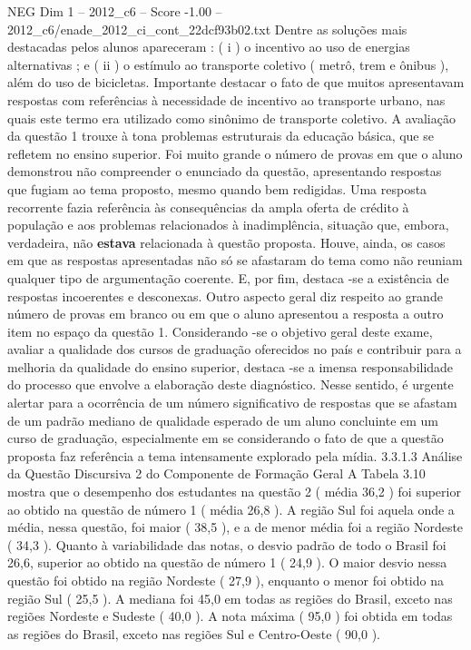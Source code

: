 \begin{textsample}{NEG Dim 1 – 2012\_c6 – Score -1.00 – 2012\_c6/enade\_2012\_ci\_cont\_22dcf93b02.txt}
Dentre as soluções mais destacadas pelos alunos apareceram : ( i ) o incentivo ao uso de energias alternativas ; e ( ii ) o estímulo ao transporte coletivo ( metrô, trem e ônibus ), além do uso de bicicletas.
Importante destacar o fato de que muitos apresentavam respostas com referências à necessidade de incentivo ao transporte urbano, nas quais este termo era utilizado como sinônimo de transporte coletivo.
A avaliação da questão 1 trouxe à tona problemas estruturais da educação básica, que se refletem no ensino superior.
Foi muito grande o número de provas em que o aluno demonstrou não compreender o enunciado da questão, apresentando respostas que fugiam ao tema proposto, mesmo quando bem redigidas.
Uma resposta recorrente fazia referência às consequências da ampla oferta de crédito à população e aos problemas relacionados à inadimplência, situação que, embora, verdadeira, não \textbf{estava} relacionada à questão proposta.
Houve, ainda, os casos em que as respostas apresentadas não só se afastaram do tema como não reuniam qualquer tipo de argumentação coerente.
E, por fim, destaca -se a existência de respostas incoerentes e desconexas.
Outro aspecto geral diz respeito ao grande número de provas em branco ou em que o aluno apresentou a resposta a outro item no espaço da questão 1.
Considerando -se o objetivo geral deste exame, avaliar a qualidade dos cursos de graduação oferecidos no país e contribuir para a melhoria da qualidade do ensino superior, destaca -se a imensa responsabilidade do processo que envolve a elaboração deste diagnóstico.
Nesse sentido, é urgente alertar para a ocorrência de um número significativo de respostas que se afastam de um padrão mediano de qualidade esperado de um aluno concluinte em um curso de graduação, especialmente em se considerando o fato de que a questão proposta faz referência a tema intensamente explorado pela mídia. 3.3.1.3 Análise da Questão Discursiva 2 do Componente de Formação Geral A Tabela 3.10 mostra que o desempenho dos estudantes na questão 2 ( média 36,2 ) foi superior ao obtido na questão de número 1 ( média 26,8 ).
A região Sul foi aquela onde a média, nessa questão, foi maior ( 38,5 ), e a de menor média foi a região Nordeste ( 34,3 ).
Quanto à variabilidade das notas, o desvio padrão de todo o Brasil foi 26,6, superior ao obtido na questão de número 1 ( 24,9 ).
O maior desvio nessa questão foi obtido na região Nordeste ( 27,9 ), enquanto o menor foi obtido na região Sul ( 25,5 ).
A mediana foi 45,0 em todas as regiões do Brasil, exceto nas regiões Nordeste e Sudeste ( 40,0 ).
A nota máxima ( 95,0 ) foi obtida em todas as regiões do Brasil, exceto nas regiões Sul e Centro-Oeste ( 90,0 ).

\end{textsample}
